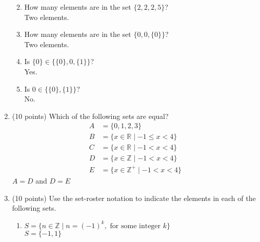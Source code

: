 \documentclass{article}
\begin{document}
\begin{enumerate}
\begin{enumerate}
        \hrulefill

        \item How many elements are in the set $\{2, 2, 2, 5\}$?\\
        \vspace{1em}
        Two elements.
        \vspace{1em}
        
        \hrulefill

        \item How many elements are in the set $\{0, 0, \{0\}\}$?\\
        \vspace{1em}
        Two elements.
        \vspace{1em}
        
        \hrulefill

        \item Is $\{0\} \in \{\{0\}, 0, \{1\}\}$?\\
        \vspace{1em}
        Yes.
        \vspace{1em}
        
        \hrulefill

        \item Is $0 \in \{\{0\}, \{1\}\}$?\\
        \vspace{1em}
        No.
        \vspace{1em}
    \end{enumerate}
    
    \hrulefill

    \item (10 points) Which of the following sets are equal?
    \begin{align*}
        A &= \{0, 1, 2, 3\} \\
        B &= \{x \in \mathbb{R} \mid -1 \leq x < 4\} \\
        C &= \{x \in \mathbb{R} \mid -1 < x < 4\} \\
        D &= \{x \in \mathbb{Z} \mid -1 < x < 4\} \\
        E &= \{x \in \mathbb{Z}^+ \mid -1 < x < 4\}
    \end{align*}
    \vspace{1em}
    $A = D$ and $D = E$
    \vspace{1em}
    
    \hrulefill

    \item (10 points) Use the set-roster notation to indicate the elements in each of the following sets.
    \begin{enumerate}
        \item $S = \{n \in \mathbb{Z} \mid n = (-1)^k, \text{ for some integer } k\}$\\
        \vspace{1em}
        $S = \{-1, 1\}$
        \vspace{1em}
        

\end{enumerate}
\end{enumerate}
\end{document}
